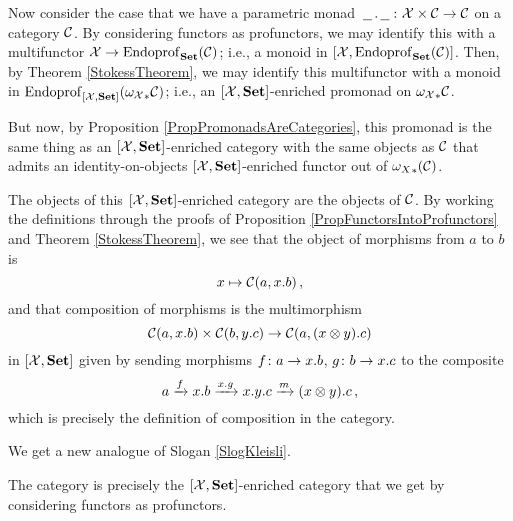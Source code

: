 \documentclass{report}[11pt]
\begin{document}
Now consider the case that we have a parametric monad $\,\underline{\hspace{1.5ex}}\,.\,\underline{\hspace{1.5ex}}\,\colon\mathcal X \times {\mathcal{C}} \to {\mathcal{C}}$ on a category ${\mathcal{C}}$.  
By considering functors as profunctors, we may identify this with a multifunctor $\mathcal X \to \operatorname{Endoprof}_{\normalfont\textbf{Set}}({\mathcal{C}})$; i.e., a monoid in $[\mathcal X,\operatorname{Endoprof}_{\normalfont\textbf{Set}}({\mathcal{C}})]$.
Then, by Theorem \ref{StokessTheorem}, we may identify this multifunctor with a monoid in $\operatorname{Endoprof}_{[\mathcal X,{\normalfont\textbf{Set}}]}({\omega_\mathcal X}_*{\mathcal{C}})$; i.e., an $[\mathcal X,{\normalfont\textbf{Set}}]$-enriched promonad on ${\omega_\mathcal X}_*{\mathcal{C}}$.

But now, by Proposition \ref{PropPromonadsAreCategories}, this promonad is the same thing as an $[\mathcal X,{\normalfont\textbf{Set}}]$-enriched category with the same objects as ${\mathcal{C}}$ that admits an identity-on-objects $[\mathcal X,{\normalfont\textbf{Set}}]$-enriched functor out of ${\omega_X}_*({\mathcal{C}})$.  

The objects of this $[\mathcal X,{\normalfont\textbf{Set}}]$-enriched category are the objects of ${\mathcal{C}}$.
By working the definitions through the proofs of Proposition \ref{PropFunctorsIntoProfunctors} and Theorem \ref{StokessTheorem}, we see that the object of morphisms from $a$ to $b$ is
\[
  x \mapsto {\mathcal{C}}(a,x.b)\,,
  \]
and that composition of morphisms is the multimorphism
\[
  {\mathcal{C}}(a,x.b) \times {\mathcal{C}}(b,y.c) \to {\mathcal{C}}(a,(x\otimes y).c)
  \]
in $[\mathcal X,{\normalfont\textbf{Set}}]$ given by sending morphisms $f\colon a \to x.b$, $g\colon b \to x.c$ to the composite
\[
  a
  \xrightarrow{f}
  x.b
  \xrightarrow{x.g}
  x.y.c \xrightarrow{m}
  (x\otimes y).c\,,
  \]
which is precisely the definition of composition in the \Mellies category.

We get a new analogue of Slogan \ref{SlogKleisli}.

\begin{slogan}
  The \Mellies category is precisely the $[\mathcal X,{\normalfont\textbf{Set}}]$-enriched category that we get by considering functors as profunctors.
\end{slogan}



\end{document}

